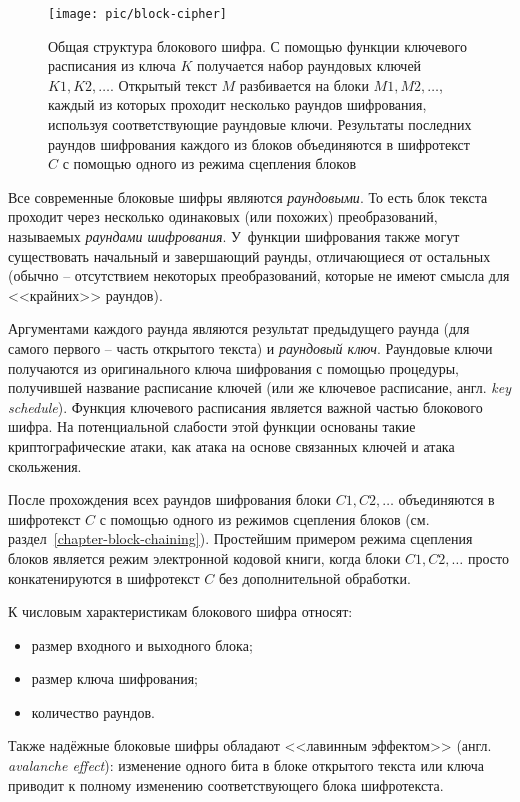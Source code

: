 \begin{figure}[!ht]
	\centering
	\texttt{[image: pic/block-cipher]}
  \caption{Общая структура блокового шифра. С помощью функции ключевого расписания из ключа $K$ получается набор раундовых ключей $K1, K2, \dots$. Открытый текст $M$ разбивается на блоки $M1, M2, \dots$, каждый из которых проходит несколько раундов шифрования, используя соответствующие раундовые ключи. Результаты последних раундов шифрования каждого из блоков объединяются в шифротекст $C$ с помощью одного из режима сцепления блоков}
  \label{fig:block-cipher}
\end{figure}

Все современные блоковые шифры являются \textit{раундовыми}. То есть блок текста проходит через несколько одинаковых (или похожих) преобразований, называемых \textit{раундами шифрования}. У~функции шифрования также могут существовать начальный и завершающий раунды, отличающиеся от остальных (обычно -- отсутствием некоторых преобразований, которые не имеют смысла для <<крайних>> раундов).

Аргументами каждого раунда являются результат предыдущего раунда (для самого первого -- часть открытого текста) и \textit{раундовый ключ}. Раундовые ключи получаются из оригинального ключа шифрования с помощью процедуры, получившей название расписание ключей (или же ключевое расписание, англ. \textit{key schedule}). Функция ключевого расписания является важной частью блокового шифра. На потенциальной слабости этой функции основаны такие криптографические атаки, как атака на основе связанных ключей и атака скольжения.

После прохождения всех раундов шифрования блоки $C1, C2, \dots$ объединяются в шифротекст $C$ с помощью одного из режимов сцепления блоков (см. раздел~\ref{chapter-block-chaining}). Простейшим примером режима сцепления блоков является режим электронной кодовой книги, когда блоки $C1, C2, \dots$ просто конкатенируются в шифротекст $C$ без дополнительной обработки.

К числовым характеристикам блокового шифра относят:
\begin{itemize}
	\item размер входного и выходного блока;
	\item размер ключа шифрования;
	\item количество раундов.
\end{itemize}

Также надёжные блоковые шифры обладают <<лавинным эффектом>> (англ. \textit{avalanche effect}): изменение одного бита в блоке открытого текста или ключа приводит к полному изменению соответствующего блока шифротекста.
